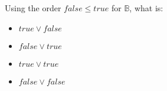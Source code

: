 
Using the order $false \leq true$ for $\mathbb{B}$, what is: \begin{itemize}
    \item $true \lor false$
    \item $false \lor true$
    \item $true \lor true$
    \item $false \lor false$
  \end{itemize}